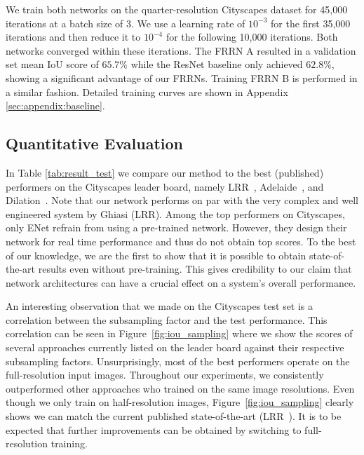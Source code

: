 \documentclass[10pt,twocolumn,letterpaper]{article}
\newcommand{\PAR}[1]{\vskip4pt \noindent {\bf #1~}}
\begin{document}
We train both networks on the quarter-resolution Cityscapes dataset for 45,000 iterations at a batch size of 3.
We use a learning rate of $10^{-3}$ for the first 35,000 iterations and then reduce it to $10^{-4}$ for the following 10,000 iterations. 
Both networks converged within these iterations. 
The FRRN A resulted in a validation set mean IoU score of $65.7\%$ while the ResNet baseline only achieved $62.8\%$, showing a significant advantage of our FRRNs. 
Training FRRN B is performed in a similar fashion.
Detailed training curves are shown in Appendix \ref{sec:appendix:baseline}. 

\subsection{Quantitative Evaluation}
\label{quantitative}

\PAR{Overview} In Table \ref{tab:result_test} we compare our method to the best (published) performers on the Cityscapes leader board, namely LRR~\cite{Ghiasi16ECCV}, Adelaide~\cite{Gu09CVPR}, and Dilation~\cite{Yu16ICLR}. 
Note that our network performs on par with the very complex and well engineered system by Ghiasi \etal (LRR). Among the top performers on Cityscapes, only ENet refrain from using a pre-trained network. However, they design their network for real time performance and thus do not obtain top scores. To the best of our knowledge, we are the first to show that it is possible to obtain state-of-the-art results even without pre-training. This gives credibility to our claim that network architectures can have a crucial effect on a system's overall performance.  

\PAR{Subsampling Factor.}
An interesting observation that we made on the Cityscapes test set is a correlation between the subsampling factor and the test performance.
This correlation can be seen in Figure~\ref{fig:iou_sampling} where we show the scores of several approaches currently listed on the leader board against their respective subsampling factors.
Unsurprisingly, most of the best performers operate on the full-resolution input images.
Throughout our experiments, we consistently outperformed other approaches who trained on the same image resolutions. 
Even though we only train on half-resolution images, Figure~\ref{fig:iou_sampling} clearly shows we can match the current published state-of-the-art (LRR~\cite{Ghiasi16ECCV}).
It is to be expected that further improvements can be obtained by switching to full-resolution training.
\end{document}
